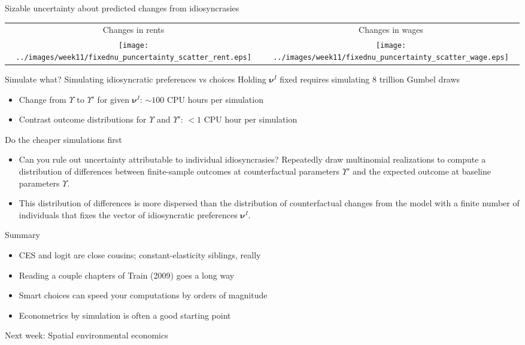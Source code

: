 \documentclass[11pt,notes=hide,aspectratio=169]{beamer}
\begin{document}
\begin{frame}{Sizable uncertainty about predicted changes from idiosyncrasies}
\begin{center}
\begin{tabular}{cc}
{ Changes in rents} & { Changes in wages}\\
\texttt{[image: ../images/week11/fixednu\_puncertainty\_scatter\_rent.eps]}
&
\texttt{[image: ../images/week11/fixednu\_puncertainty\_scatter\_wage.eps]}
\end{tabular}
\end{center}
\end{frame}
\begin{frame}{Simulate what? Simulating idiosyncratic preferences vs choices}
Holding $\boldsymbol \nu^{I}$ fixed requires simulating 8 trillion Gumbel draws
\begin{itemize}
\item Change from $\Upsilon$ to $\Upsilon'$ for given $\boldsymbol \nu^{I}$:
$\sim100$ CPU hours per simulation
\item Contrast outcome distributions for $\Upsilon$ and $\Upsilon'$:
$<1$ CPU hour per simulation
\end{itemize}
Do the cheaper simulations first
\begin{itemize}
\item Can you rule out uncertainty attributable to individual idiosyncrasies?
Repeatedly draw multinomial realizations
to compute a distribution of differences between finite-sample outcomes at counterfactual parameters $\Upsilon'$ and the expected outcome at baseline parameters $\Upsilon$.
\item {This distribution of differences is more dispersed than
the distribution of counterfactual changes from the model with a finite number of individuals that fixes the vector of idiosyncratic preferences $\boldsymbol \nu^{I}$.\par}
\end{itemize}
\end{frame}
\begin{frame}{Summary}
\begin{itemize}
\item CES and logit are close cousins; constant-elasticity siblings, really
\item Reading a couple chapters of Train (2009) goes a long way
\item Smart choices can speed your computations by orders of magnitude
\item Econometrics by simulation is often a good starting point
\end{itemize}
Next week: Spatial environmental economics
\end{frame}
\end{document}
